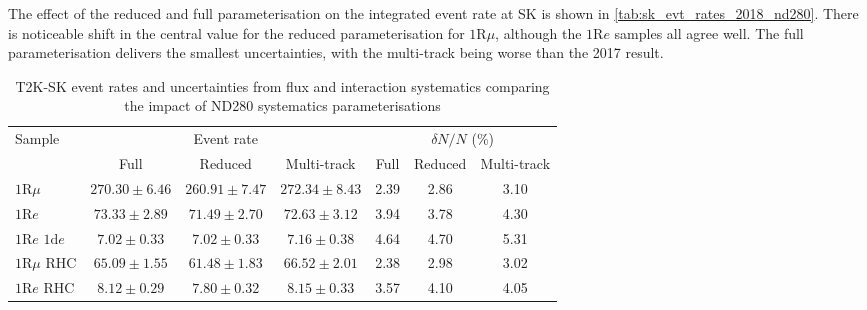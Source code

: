 The effect of the reduced and full parameterisation on the integrated event rate at SK is shown in \autoref{tab:sk_evt_rates_2018_nd280}. There is noticeable shift in the central value for the reduced parameterisation for $1\text{R}\mu$, although the $1\text{R}e$ samples all agree well. The full parameterisation delivers the smallest uncertainties, with the multi-track being worse than the 2017 result. 
\begin{table}
	\begin{tabular}{l | c c c | c c c }
		\hline
		\hline
		Sample  & \multicolumn{3}{c|}{Event rate} & \multicolumn{3}{c}{$\delta N/N$ (\%)} \\
				& Full & Reduced & Multi-track & Full & Reduced & Multi-track \\
		\hline
		$1\text{R}\mu$ & $270.30\pm6.46$ & $260.91\pm7.47$ & $272.34\pm8.43$ & 2.39 & 2.86 & 3.10 \\
		$1\text{R}e$  & $73.33\pm2.89$ & $71.49\pm2.70$ & $72.63\pm3.12$ & 3.94 & 3.78 & 4.30  \\
		$1\text{R}e \text{ 1d}e$ & $7.02\pm0.33$ & $7.02\pm0.33$ & $7.16\pm0.38$ & 4.64 & 4.70 & 5.31 \\
		
		$1\text{R}\mu \text{ RHC}$  & $65.09\pm1.55$ & $61.48\pm1.83$ & $66.52\pm2.01$ & 2.38 & 2.98 & 3.02 \\
		$1\text{R}e \text{ RHC}$ & $8.12\pm0.29$ & $7.80\pm0.32$ & $8.15\pm0.33$ & 3.57 & 4.10 & 4.05 \\
		\hline
		\hline
	\end{tabular}
	\caption{T2K-SK event rates and uncertainties from flux and interaction systematics comparing the impact of ND280 systematics parameterisations}
	\label{tab:sk_evt_rates_2018_nd280}
\end{table}


